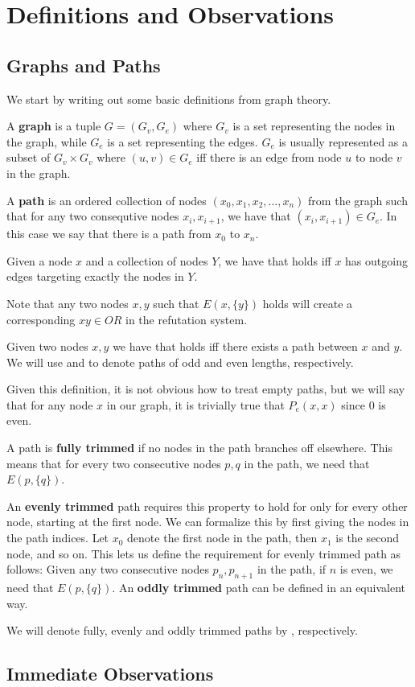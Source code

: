 \section{Definitions and Observations}
\label{sec:Definitions and Observations}
\subsection{Graphs and Paths}
\label{sub:Graphs and Paths}
We start by writing out some basic definitions from graph theory.
\begin{definition}
  A \textbf{graph} is a tuple $G = (G_v, G_e)$ where $G_v$ is a set representing the nodes in the graph, while $G_e$ is a set representing the edges.  $G_e$ is usually represented as a subset of $G_v \times G_v$ where $(u,v) \in G_e$ iff there is an edge from node $u$ to node $v$ in the graph.
\end{definition}
\begin{definition}
  A \textbf{path} is an ordered collection of nodes $(x_0, x_1, x_2, \dots, x_n)$ from the graph such that for any two consequtive nodes $x_i,x_{i+1}$, we have that $(x_i, x_{i+1}) \in G_e$.
  In this case we say that there is a path from $x_0$ to $x_n$.
\end{definition}
\begin{definition}
  Given a node $x$ and a collection of nodes $Y$, we have that  holds iff $x$ has outgoing edges targeting exactly the nodes in $Y$.
\end{definition}
Note that any two nodes $x,y$ such that $E(x,\{y\})$ holds will create a corresponding $xy \in OR$ in the refutation system.
\begin{definition}
  Given two nodes $x,y$ we have that  holds iff there exists a path between $x$ and $y$.
  We will use  and  to denote paths of odd and even lengths, respectively.
\end{definition}
  Given this definition, it is not obvious how to treat empty paths, but we will say that for any node $x$ in our graph, it is trivially true that $P_e(x,x)$ since $0$ is even.
\begin{definition}
  A path is \textbf{fully trimmed} if no nodes in the path branches off elsewhere.
  This means that for every two consecutive nodes $p,q$ in the path, we need that $E(p,\{q\})$.
\end{definition}

An \textbf{evenly trimmed} path requires this property to hold for only for every other node, starting at the first node.
We can formalize this by first giving the nodes in the path indices.
Let $x_0$ denote the first node in the path, then $x_1$ is the second node, and so on.
This lets us define the requirement for evenly trimmed path as follows: Given any two consecutive nodes $p_n,p_{n+1}$ in the path, if $n$ is even, we need that $E(p,\{q\})$.
An \textbf{oddly trimmed} path can be defined in an equivalent way.

We will denote fully, evenly and oddly trimmed paths by , respectively.

\subsection{Immediate Observations}
\label{sub:Immediate Observations}
